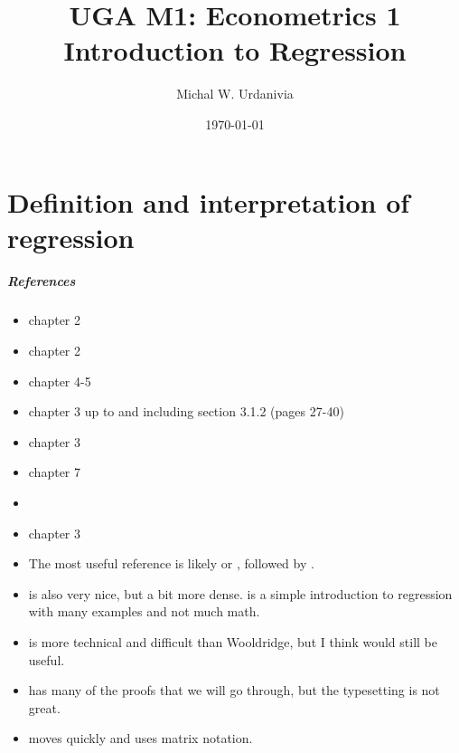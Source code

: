 


\title[Econometrics 1: Regression]{UGA M1: Econometrics 1\\
  \textbf{Introduction to Regression}}
\date{\today}
\author{Michal W. Urdanivia\inst{*}}




\frame{\titlepage}



\part{Definition and interpretation of regression}
\frame{\partpage}
\begin{frame}
  \tableofcontents  
\end{frame}

\begin{frame}[allowframebreaks]
  \frametitle{References}
  \begin{itemize}
  \item \cite{ap2014} chapter 2
  \item \cite{w2013} chapter 2    
  \item \cite{sw2009} chapter 4-5
  \item \cite{ap2009} chapter 3 up to and including section 3.1.2
    (pages 27-40)
  \item \cite{abbring2001} chapter 3
  \item \cite{dbc2012} chapter 7
  \item \cite{bierens2010sreg}
  \item \cite{baltagi2002} chapter 3
 \framebreak 
\item The most useful reference is likely \cite{w2013} or \cite{sw2009},
followed by \cite{ap2014}. 
\item \cite{ap2009} is also very nice, but a bit
more dense. \cite{dbc2012} is a simple introduction to regression with
many examples and not much math. 
\item \cite{baltagi2002}  is more technical and difficult than
Wooldridge, but I think would still be useful. 
\item  \cite{bierens2010sreg}
has many of the proofs that we will go through, but the typesetting is
not great.  
\item \cite{abbring2001} moves quickly and uses matrix
notation. 
\end{itemize}
\end{frame}


